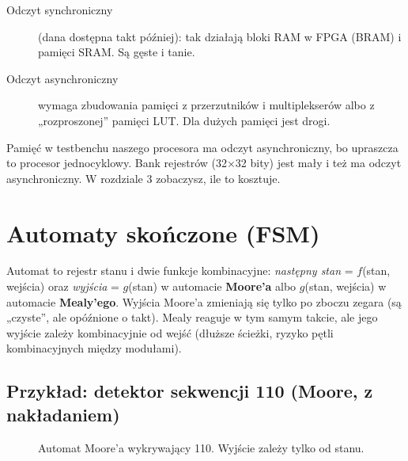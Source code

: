 \begin{description}
  \item[Odczyt synchroniczny] (dana dostępna takt później): tak działają bloki
    RAM w FPGA (BRAM) i pamięci SRAM. Są gęste i tanie.
  \item[Odczyt asynchroniczny] wymaga zbudowania pamięci z przerzutników i
    multiplekserów albo z „rozproszonej” pamięci LUT. Dla dużych pamięci jest
    drogi.
\end{description}

Pamięć w testbenchu naszego procesora ma odczyt asynchroniczny, bo upraszcza
to procesor jednocyklowy. Bank rejestrów (32×32 bity) jest mały i też ma
odczyt asynchroniczny. W rozdziale 3 zobaczysz, ile to kosztuje.

\section{Automaty skończone (FSM)}

Automat to rejestr stanu i dwie funkcje kombinacyjne:
\emph{następny stan} = $f$(stan, wejścia) oraz \emph{wyjścia} = $g$(stan)
w automacie \textbf{Moore'a} albo $g$(stan, wejścia) w automacie
\textbf{Mealy'ego}. Wyjścia Moore'a zmieniają się tylko po zboczu zegara (są
„czyste”, ale opóźnione o takt). Mealy reaguje w tym samym takcie, ale jego
wyjście zależy kombinacyjnie od wejść (dłuższe ścieżki, ryzyko pętli
kombinacyjnych między modułami).

\subsection*{Przykład: detektor sekwencji 110 (Moore, z nakładaniem)}

\begin{figure}[h]
\centering
{}
\caption{Automat Moore'a wykrywający 110. Wyjście  zależy tylko od stanu.}
\label{fig:fsm110}
\end{figure}


